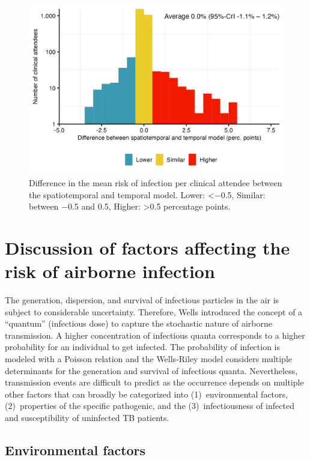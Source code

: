 \documentclass[fleqn,11pt]{wlscirep_supp}
\begin{document}
\begin{figure}[!htpb]
    \centering
    \includegraphics{results/modeling/model-comparison.png}
    \caption{Difference in the mean risk of infection per clinical attendee between the spatiotemporal and temporal model. Lower: <$-$0.5, Similar: between $-$0.5 and 0.5, Higher: >0.5 percentage points.}
    \label{fig:model-comparison}
\end{figure}

\clearpage

\section{Discussion of factors affecting the risk of airborne infection}\label{sec:depth-discussion}


The generation, dispersion, and survival of infectious particles in the air is subject to considerable uncertainty. Therefore, Wells\cite{Wells1955} introduced the concept of a ``quantum'' (infectious dose) to capture the stochastic nature of airborne transmission. A higher concentration of infectious quanta corresponds to a higher probability for an individual to get infected. The probability of infection is modeled with a Poisson relation and the Wells-Riley model considers multiple determinants for the generation and survival of infectious quanta. Nevertheless, transmission events are difficult to predict as the occurrence depends on multiple other factors that can broadly be categorized into (1)~environmental factors, (2)~properties of the specific pathogenic, and the (3)~infectiousness of infected and susceptibility of uninfected TB patients. 

\subsection{Environmental factors}
\end{document}
